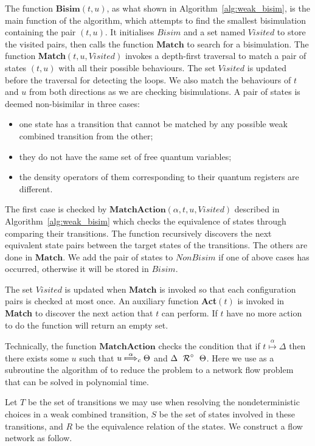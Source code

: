 \documentclass[a4paper,runningheads]{llncs}
\newcommand{\lift}[1]{\mathrel{{#1}^\circ}}
\begin{document}
The function $\textbf{Bisim}(t,u)$, as what shown in Algorithm~\ref{alg:weak_bisim}, is the main function of the algorithm, which attempts to find the smallest bisimulation containing the pair $(t,u)$. It initialises $Bisim$ and a set named $Visited$ to store the visited pairs, then calls the function $\textbf{Match}$ to search for a bisimulation. The function \textbf{Match}$(t,u,Visited)$ invokes a depth-first traversal to match a pair of states $(t,u)$ with all their possible behaviours. The set $Visited$ is updated before the traversal for detecting the loops. We also match the behaviours of $t$ and $u$ from both directions as we are checking bisimulations. A pair of states is deemed non-bisimilar in three cases:
\begin{itemize}
    \item one state has a transition that cannot be matched by any possible weak combined transition from the other;
    \item they do not have the same set of free quantum variables;
    \item the density operators of them corresponding to their quantum registers are different.
\end{itemize}
The first case is checked by $\textbf{MatchAction}(\alpha,t,u,Visited)$ described in Algorithm~\ref{alg:weak_bisim} which checks the equivalence of states through comparing their transitions. The function recursively discovers the next equivalent state pairs between the target states of the transitions. The others are done in $\textbf{Match}$. We add the pair of states to $NonBisim$ if one of above cases has occurred, otherwise it will be stored in $Bisim$.

The set $Visited$ is updated when $\textbf{Match}$ is invoked so that each configuration pairs is checked at most once.
An auxiliary function \textbf{Act}$(t)$ is invoked in \textbf{Match} to discover the next action that $t$ can perform. If $t$ have no more action to do the function will return an empty set.

Technically, the function $\textbf{MatchAction}$ checks the condition that if $t\overset{\alpha}{\longmapsto}\Delta$ then there exists some $u$ such that $u\overset{\alpha}{\mapstochar\Longrightarrow}_{c}\Theta$ and $\Delta~\lift{\aRel}~\Theta$. Here we use as a subroutine the algorithm of \cite{TH15} to reduce the problem to a network flow problem that can be solved  in polynomial time.

Let $T$ be the set of transitions we may use when resolving the nondeterministic choices in a weak combined transition, $S$ be the set of states involved in these transitions, and $R$ be the equivalence relation of the states. We construct a flow network as follow.
\end{document}
